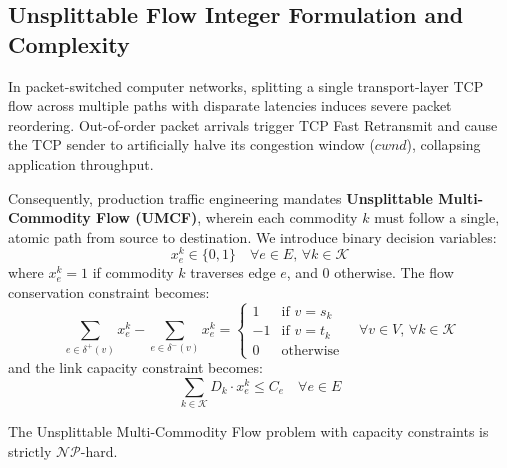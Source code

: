 \subsection{Unsplittable Flow Integer Formulation and Complexity}
In packet-switched computer networks, splitting a single transport-layer TCP flow across multiple paths with disparate latencies induces severe packet reordering. Out-of-order packet arrivals trigger TCP Fast Retransmit and cause the TCP sender to artificially halve its congestion window ($cwnd$), collapsing application throughput.

Consequently, production traffic engineering mandates \textbf{Unsplittable Multi-Commodity Flow (UMCF)}, wherein each commodity $k$ must follow a single, atomic path from source to destination. We introduce binary decision variables:
\begin{equation}
    x_e^k \in \{0, 1\} \quad \forall e \in E, \, \forall k \in \mathcal{K}
\end{equation}
where $x_e^k = 1$ if commodity $k$ traverses edge $e$, and $0$ otherwise. The flow conservation constraint becomes:
\begin{equation}
    \sum_{e \in \delta^+(v)} x_e^k - \sum_{e \in \delta^-(v)} x_e^k = \begin{cases}
        1 & \text{if } v = s_k \\
        -1 & \text{if } v = t_k \\
        0 & \text{otherwise}
    \end{cases} \quad \forall v \in V, \, \forall k \in \mathcal{K}
\end{equation}
and the link capacity constraint becomes:
\begin{equation}
    \sum_{k \in \mathcal{K}} D_k \cdot x_e^k \le C_e \quad \forall e \in E
\end{equation}

\begin{theorem}
The Unsplittable Multi-Commodity Flow problem with capacity constraints is strictly $\mathcal{NP}$-hard.
\end{theorem}

